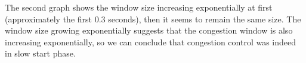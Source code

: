 The second graph shows the window size increasing exponentially at first (approximately the first 0.3 seconds), then it seems to remain the same size. The window size growing exponentially suggests that the congestion window is also increasing exponentially, so we can conclude that congestion control was indeed in slow start phase.